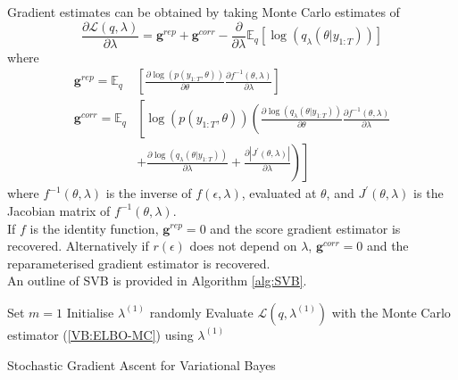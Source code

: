 \documentclass[
12pt, %
onehalfspacing, %
nohyperref, %
headsepline, %
chapterinoneline, %
]{MastersDoctoralThesis} %
\begin{document}
Gradient estimates can be obtained by taking Monte Carlo estimates of 
\begin{equation}
\label{SVB:grp}
\frac{\partial\mathcal{L}(q, \lambda)}{\partial \lambda} = \textbf{g}^{rep} + \textbf{g}^{corr} - \frac{\partial}{\partial \lambda} \mathbb{E}_{q} \left[ \log(q_{\lambda}(\theta | y_{1:T})) \right]
\end{equation}
where
\begin{align}
\textbf{g}^{rep} =  \mathbb{E}_{q} &\left[\frac{\partial \log(p(y_{1:T}, \theta))}{\partial \theta} \frac{\partial f^{-1}(\theta, \lambda)}{\partial \lambda} \right] \\
\textbf{g}^{corr} =  \mathbb{E}_{q} &\left[ \log(p(y_{1:T}, \theta)) \left( \frac{\partial \log(q_{\lambda}(\theta | y_{1:T}))}{\partial \theta} \frac{\partial f^{-1}(\theta, \lambda)}{\partial \lambda}  \right. \right. \nonumber \\
&+ \left. \left. \frac{\partial \log(q_{\lambda}(\theta | y_{1:T}))}{\partial \lambda} + \frac{\partial |J^{\prime}(\theta, \lambda)|}{\partial \lambda} \right) \right]
\end{align}
where $f^{-1}(\theta, \lambda)$ is the inverse of $f(\epsilon, \lambda)$, evaluated at $\theta$, and $J^{\prime}(\theta, \lambda)$ is the Jacobian matrix of $f^{-1}(\theta, \lambda)$.
\\

If $f$ is the identity function, $\textbf{g}^{rep} = 0$ and the score gradient estimator is recovered. Alternatively if $r(\epsilon)$ does not depend on $\lambda$, $\textbf{g}^{corr} = 0$ and the reparameterised gradient estimator is recovered.
\\

An outline of SVB is provided in Algorithm \ref{alg:SVB}.
\\

\begin{algorithm}[H]
 Set $m = 1$\;
 Initialise $\lambda^{(1)}$ randomly\;
 Evaluate $\mathcal{L}(q, \lambda^{(1)})$ with the Monte Carlo estimator (\ref{VB:ELBO-MC}) using $\lambda^{(1)}$\;
 \caption{Stochastic Gradient Ascent for Variational Bayes}
  \label{alg:SVB}
\end{algorithm}
\end{document}
